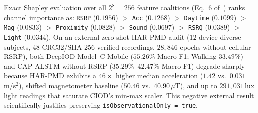 Exact Shapley evaluation over all $2^8=256$ feature coalitions (Eq.~6 of~\cite{bakirtzis2022ciod}) ranks channel importance as: \texttt{RSRP} ($0.1956$) $>$ \texttt{Acc} ($0.1268$) $>$ \texttt{Daytime} ($0.1099$) $>$ \texttt{Mag} ($0.0833$) $>$ \texttt{Proximity} ($0.0828$) $>$ \texttt{Sound} ($0.0697$) $>$ \texttt{RSRQ} ($0.0389$) $>$ \texttt{Light} ($0.0344$). On an external zero-shot HAR-PMD audit ($12$ device-diverse subjects, $48$ CRC32/SHA-256 verified recordings, $28{,}846$ epochs without cellular RSRP), both DeepIOD Model~C-Mobile ($55.26\%$ Macro-F1; Walking $33.49\%$) and CAP-ALSTM without RSRP ($35.29\%$--$42.47\%$ Macro-F1) degrade sharply because HAR-PMD exhibits a $46\times$ higher median acceleration ($1.42$ vs.\ $0.031$\,m/s$^2$), shifted magnetometer baseline ($50.46$ vs.\ $40.90$\,$\mu$T), and up to $291{,}031$\,lux light readings that saturate CIOD's min-max scaler. This negative external result scientifically justifies preserving \texttt{isObservationalOnly = true}.

